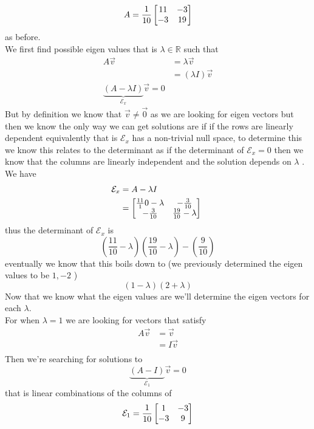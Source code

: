 \documentclass[11pt]{book}
\begin{document}
\begin{eg}
    \[
    A= \frac{1}{10}\mat[b]{ 11 & -3 \\ -3 & 19 }
    \]
    as before.\\
    We first find possible eigen values that is $\lambda \in \mathbb{R} $ such that 
    \begin{align*}
        A\vec{v} &= \lambda \vec{v}   \\ 
                 &= \left( \lambda I \right) \vec{v}   \\ 
         \underbrace{\left( A - \lambda I \right)  }_{\mathcal{E} _{x} }\vec{v}  = 0
    \end{align*}
    But by definition we know that $\vec{v} \neq \vec{0} $ as we are looking for eigen vectors but then we know the only way we can get solutions are if if the rows are linearly dependent equivalently that is $\mathcal{E} _{x} $ has a non-trivial null space, to determine this we know this relates to the determinant as if the determinant of $\mathcal{E} _{x} = 0$ then we know that the columns are linearly independent and the solution depends on $\lambda $ .\\
    We have 
    \begin{align*}
        \mathcal{E} _{x} &= A - \lambda I  \\ 
        &= \mat[b]{ \frac{11}{1}0 - \lambda  & -\frac{3}{10} \\ -\frac{3}{10} & \frac{19}{10} - \lambda  }  \ 
    \end{align*}
    thus the determinant of $\mathcal{E} _{x} $ is 
    \[
        \left( \frac{11}{10} - \lambda  \right) \left( \frac{19}{10} - \lambda  \right)  - \left( \frac{9}{10} \right) 
    \]
    eventually we know that this boils down to (we previously determined the eigen values to be $1,-2$ )
    \[
        \left( 1 - \lambda  \right) \left( 2 + \lambda  \right) 
    \]
    Now that we know what the eigen values are we'll determine the eigen vectors for each $\lambda $. \\
    For when $\lambda = 1$ we are looking for vectors that satisfy
    \begin{align*}
        A\vec{v} &= \vec{v}   \\ 
        &= I \vec{v}   \\ 
    \end{align*}
    Then we're searching for solutions to 
    \[
        \underbrace{\left( A - I \right)}_{\mathcal{E} _{1} }  \vec{v} = 0
    \]
    that is linear combinations of the columns of 
    \[
    \mathcal{E} _{1} = \frac{1}{10}\mat[b]{ 1 & -3 \\ -3 & 9 }
\]
\end{eg}
\end{document}
